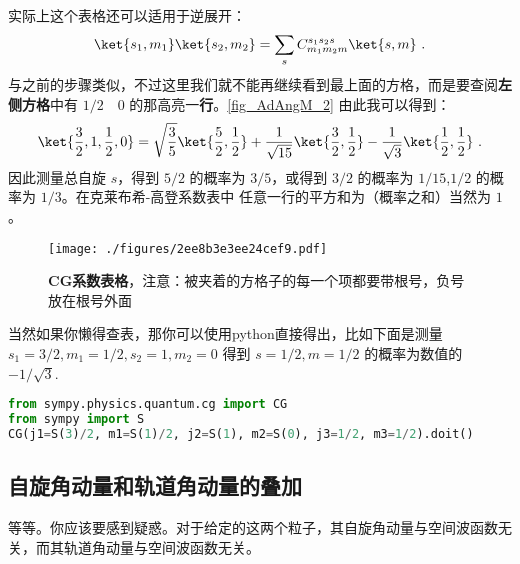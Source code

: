 实际上这个表格还可以适用于逆展开：
\begin{equation}
\ket{s_1,m_1}\ket{s_2,m_2}=\sum_{s}C^{s_1s_2s}_{m_1m_2m}\ket{s,m}~.
\end{equation}
与之前的步骤类似，不过这里我们就不能再继续看到最上面的方格，而是要查阅\textbf{左侧方格}中有 $1/2\quad 0$ 的那高亮一\textbf{行}。\autoref{fig_AdAngM_2} 
由此我可以得到：
\begin{equation}
\ket{\frac{3}{2},1,\frac{1}{2},0}=\sqrt{\frac{3}{5}}\ket{\frac{5}{2},\frac{1}{2}}+\frac{1}{\sqrt{15}}\ket{\frac{3}{2},\frac{1}{2}}-\frac{1}{\sqrt{3}}\ket{\frac{1}{2},\frac{1}{2}}~.
\end{equation}
因此测量总自旋 $s$，得到 $5/2$ 的概率为 $3/5$，或得到 $3/2$ 的概率为 $1/15$,$1/2$ 的概率为 $1/3$。在克莱布希-高登系数表中
任意一行的平方和为（概率之和）当然为 $1$。
\begin{figure}[ht]
\centering
\texttt{[image: ./figures/2ee8b3e3ee24cef9.pdf]}
\caption{\textbf{CG系数表格}，注意：被夹着的方格子的每一个项都要带根号，负号放在根号外面} \label{fig_AdAngM_1}
\end{figure}

当然如果你懒得查表，那你可以使用python直接得出，比如下面是测量 $s_1=3/2,m_1=1/2,s_2=1,m_2=0$ 得到 $s=1/2,m=1/2$ 的概率为数值的 $-1/\sqrt{3}$.
\begin{lstlisting}[language=python]
from sympy.physics.quantum.cg import CG
from sympy import S
CG(j1=S(3)/2, m1=S(1)/2, j2=S(1), m2=S(0), j3=1/2, m3=1/2).doit()
\end{lstlisting}

\subsection{自旋角动量和轨道角动量的叠加}
等等。你应该要感到疑惑。对于给定的这两个粒子，其自旋角动量与空间波函数无关，而其轨道角动量与空间波函数无关。
